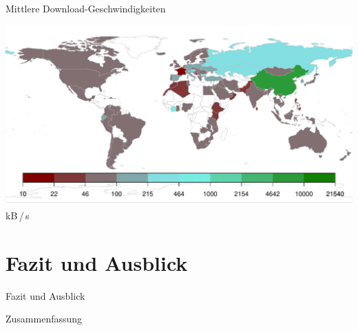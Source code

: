 \documentclass[dvipsnames]{beamer} %
\begin{document}
	\begin{frame}{Mittlere Download-Geschwindigkeiten}
		\begin{center}
	    \includegraphics[width=\textwidth]{../result/2015-08-30_20-combined_speed_map}\\
	    {\small kB\,/\,s}
	  \end{center}
	\end{frame}

	\section{Fazit und Ausblick}
	\begin{frame}{Fazit und Ausblick}
	\end{frame}

	\begin{frame}{Zusammenfassung}
		\tableofcontents
	\end{frame}
\end{document}
